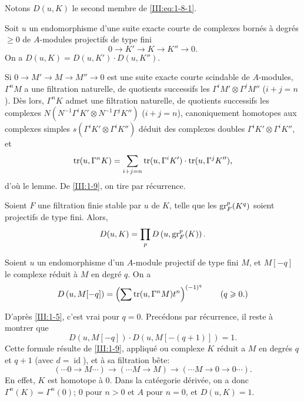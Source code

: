 Notons $D(u,K)$ le second membre de \eqref{III:eq:1-8-1}. 





\begin{lemma_}\label{III:1-9}
Soit $u$ un endomorphisme d'une suite exacte courte de complexes bornés à 
degrés $\geqslant 0$ de $A$-modules projectifs de type fini 
\[
  0 \to K' \to K \to K'' \to 0 \text{.}
\]
On a $D(u,K)=D(u,K')\cdot D(u,K'')$.
\end{lemma_}

Si $0\to M'\to M\to M''\to 0$ est une suite exacte courte scindable de 
$A$-modules, $\Gamma^n M$ a une filtration naturelle, de quotients successifs 
les $\Gamma^i M'\otimes \Gamma^j M''$ ($i+j=n$). Dès lors, $\Gamma^n K$ admet 
une filtration naturelle, de quotients successifs les complexes 
$N(N^{-1} \Gamma^i K'\otimes N^{-1}\Gamma^j K'')$ ($i+j=n$), canoniquement 
homotopes aux complexes simples $s(\Gamma^i K'\otimes \Gamma^i K'')$ déduit 
des complexes doubles $\Gamma^i K'\otimes \Gamma^i K''$, et 
\[
  \operatorname{tr}(u,\Gamma^n K) = \sum_{i+j=n} \operatorname{tr}(u,\Gamma^i K')\cdot \operatorname{tr}(u,\Gamma^j K'') \text{,}
\]
d'où le lemme. De \ref{III:1-9}, on tire par récurrence. 





\begin{lemma_}\label{III:1-10}
Soient $F$ une filtration finie stable par $u$ de $K$, telle que les 
$\operatorname{gr}_F^p(K^q)$ soient projectifs de type fini. Alors, 
\[
  D(u,K) = \prod_p D\left(u,\operatorname{gr}_F^p(K)\right) \text{.}
\]
\end{lemma_}





\begin{lemma_}\label{III:1-11}
Soient $u$ un endomorphisme d'un $A$-module projectif de type fini $M$, et 
$M[-q]$ le complexe réduit à $M$ en degré $q$. On a 
\[
  D\left(u,M[-q]\right) = \left(\sum \operatorname{tr}(u,\Gamma^n M) t^n\right)^{(-1)^q} \qquad \text{($q\geqslant 0$.)}
\]
\end{lemma_}





D'après \ref{III:1-5}, c'est vrai pour $q=0$. Precédons par récurrence, il 
reste à montrer que 
\[
  D\left(u,M[-q]\right) \cdot D\left(u,M[-(q+1)]\right) = 1 \text{.}
\]
Cette formule résulte de \ref{III:1-9}, appliqué ou complexe $K$ réduit a 
$M$ en degrés $q$ et $q+1$ (avec $d=\operatorname{id}$), et à sa 
filtration bête:
\[
  (\cdots 0 \to M \cdots) \to (\cdots M \to M) \to (\cdots M \to 0 \to 0 \cdots) \text{.}
\]
En effet, $K$ est homotope à $0$. Dans la catéegorie dérivée, on a donc 
$\Gamma^n(K)=\Gamma^n(0)$; $0$ pour $n>0$ et $A$ pour $n=0$, et $D(u,K)=1$. 





